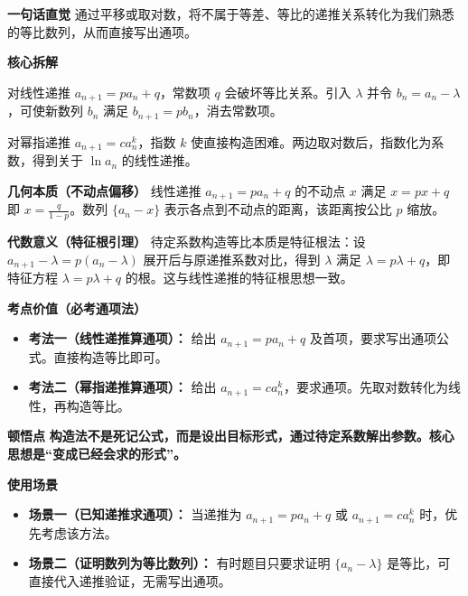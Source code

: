 \begin{explanationbox}
	\textbf{\textcolor{CExplanation}{一句话直觉}}
	通过平移或取对数，将不属于等差、等比的递推关系转化为我们熟悉的等比数列，从而直接写出通项。

	\medskip
	\textbf{\textcolor{CExplanation}{核心拆解}}
	\begin{description}[style=nextline,leftmargin=2.8em,labelsep=0.5em,itemsep=0.45em]
		\item[\textbf{要点一（平移消常数）：}]
			对线性递推 $a_{n+1}=p a_n+q$，常数项 $q$ 会破坏等比关系。引入 $\lambda$ 并令 $b_n=a_n-\lambda$，可使新数列 $b_n$ 满足 $b_{n+1}=p b_n$，消去常数项。
		\item[\textbf{要点二（取对降次幂）：}]
			对幂指递推 $a_{n+1}=c a_n^k$，指数 $k$ 使直接构造困难。两边取对数后，指数化为系数，得到关于 $\ln a_n$ 的线性递推。
	\end{description}

	\medskip
	\textbf{\textcolor{CExplanation}{几何本质（不动点偏移）}}
	线性递推 $a_{n+1}=p a_n+q$ 的不动点 $x$ 满足 $x=p x+q$ 即 $x=\frac{q}{1-p}$。数列 $\{a_n-x\}$ 表示各点到不动点的距离，该距离按公比 $p$ 缩放。

	\medskip
	\textbf{\textcolor{CExplanation}{代数意义（特征根引理）}}
	待定系数构造等比本质是特征根法：设 $a_{n+1}-\lambda=p(a_n-\lambda)$ 展开后与原递推系数对比，得到 $\lambda$ 满足 $\lambda=p\lambda+q$，即特征方程 $\lambda=p\lambda+q$ 的根。这与线性递推的特征根思想一致。

	\medskip
	\textbf{\textcolor{CExplanation}{考点价值（必考通项法）}}
	\begin{itemize}[leftmargin=*,itemsep=0.5em,topsep=0.4em]
		\item \textbf{考法一（线性递推算通项）：} 给出 $a_{n+1}=p a_n+q$ 及首项，要求写出通项公式。直接构造等比即可。
		\item \textbf{考法二（幂指递推算通项）：} 给出 $a_{n+1}=c a_n^k$，要求通项。先取对数转化为线性，再构造等比。
	\end{itemize}

	\medskip
	\textbf{\textcolor{CExplanation}{顿悟点}}
	\textbf{构造法不是死记公式，而是设出目标形式，通过待定系数解出参数。核心思想是“变成已经会求的形式”。}

	\medskip
	\textbf{\textcolor{CExplanation}{使用场景}}
	\begin{itemize}[leftmargin=*,itemsep=0.5em,topsep=0.4em]
		\item \textbf{场景一（已知递推求通项）：} 当递推为 $a_{n+1}=p a_n+q$ 或 $a_{n+1}=c a_n^k$ 时，优先考虑该方法。
		\item \textbf{场景二（证明数列为等比数列）：} 有时题目只要求证明 $\{a_n-\lambda\}$ 是等比，可直接代入递推验证，无需写出通项。
	\end{itemize}

\end{explanationbox}
